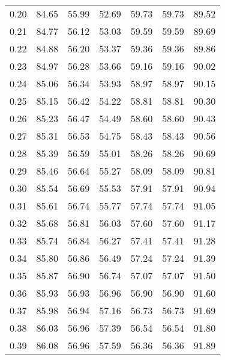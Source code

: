 \begin{tabular}{|c|c|c|c|c|c|c|}
      0.20 &     84.65 &     55.99 &      52.69 &   59.73 &      59.73 &         89.52 \\
      0.21 &     84.77 &     56.12 &      53.03 &   59.59 &      59.59 &         89.69 \\
      0.22 &     84.88 &     56.20 &      53.37 &   59.36 &      59.36 &         89.86 \\
      0.23 &     84.97 &     56.28 &      53.66 &   59.16 &      59.16 &         90.02 \\
      0.24 &     85.06 &     56.34 &      53.93 &   58.97 &      58.97 &         90.15 \\
      0.25 &     85.15 &     56.42 &      54.22 &   58.81 &      58.81 &         90.30 \\
      0.26 &     85.23 &     56.47 &      54.49 &   58.60 &      58.60 &         90.43 \\
      0.27 &     85.31 &     56.53 &      54.75 &   58.43 &      58.43 &         90.56 \\
      0.28 &     85.39 &     56.59 &      55.01 &   58.26 &      58.26 &         90.69 \\
      0.29 &     85.46 &     56.64 &      55.27 &   58.09 &      58.09 &         90.81 \\
      0.30 &     85.54 &     56.69 &      55.53 &   57.91 &      57.91 &         90.94 \\
      0.31 &     85.61 &     56.74 &      55.77 &   57.74 &      57.74 &         91.05 \\
      0.32 &     85.68 &     56.81 &      56.03 &   57.60 &      57.60 &         91.17 \\
      0.33 &     85.74 &     56.84 &      56.27 &   57.41 &      57.41 &         91.28 \\
      0.34 &     85.80 &     56.86 &      56.49 &   57.24 &      57.24 &         91.39 \\
      0.35 &     85.87 &     56.90 &      56.74 &   57.07 &      57.07 &         91.50 \\
      0.36 &     85.93 &     56.93 &      56.96 &   56.90 &      56.90 &         91.60 \\
      0.37 &     85.98 &     56.94 &      57.16 &   56.73 &      56.73 &         91.69 \\
      0.38 &     86.03 &     56.96 &      57.39 &   56.54 &      56.54 &         91.80 \\
      0.39 &     86.08 &     56.96 &      57.59 &   56.36 &      56.36 &         91.89 \\

\end{tabular}
